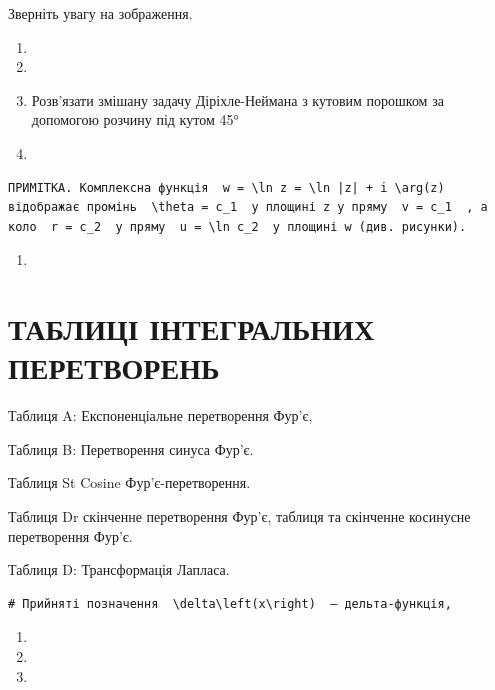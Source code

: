 \documentclass[
  ukrainian,
]{article}
\providecommand{\tightlist}{%
  \setlength{\itemsep}{0pt}\setlength{\parskip}{0pt}}
\begin{document}
Зверніть увагу на зображення.

\begin{enumerate}
\def\labelenumi{\arabic{enumi}.}
\setcounter{enumi}{18}
\item
\item
\item
  Розв'язати змішану задачу Діріхле-Неймана з кутовим порошком за
  допомогою розчину під кутом 45°
\item
\end{enumerate}

\begin{verbatim}
ПРИМІТКА. Комплексна функція  w = \ln z = \ln |z| + i \arg(z)  відображає промінь  \theta = c_1  у площині z у пряму  v = c_1  , а коло  r = c_2  у пряму  u = \ln c_2  у площині w (див. рисунки).
\end{verbatim}

\begin{enumerate}
\def\labelenumi{\arabic{enumi}.}
\setcounter{enumi}{10}
\tightlist
\item
\end{enumerate}

\section{ТАБЛИЦІ ІНТЕГРАЛЬНИХ
ПЕРЕТВОРЕНЬ}\label{ux442ux430ux431ux43bux438ux446ux456-ux456ux43dux442ux435ux433ux440ux430ux43bux44cux43dux438ux445-ux43fux435ux440ux435ux442ux432ux43eux440ux435ux43dux44c}

Таблиця A: Експоненціальне перетворення Фур'є,

Таблиця B: Перетворення синуса Фур'є.

Таблиця St Cosine Фур'є-перетворення.

Таблиця Dr скінченне перетворення Фур'є, таблиця та скінченне косинусне
перетворення Фур'є.

Таблиця D: Трансформація Лапласа.

\begin{verbatim}
# Прийняті позначення  \delta\left(x\right)  — дельта-функція,
\end{verbatim}

\begin{enumerate}
\def\labelenumi{\arabic{enumi}.}
\setcounter{enumi}{11}
\tightlist
\item
\item
\item
\end{enumerate}
\end{document}
